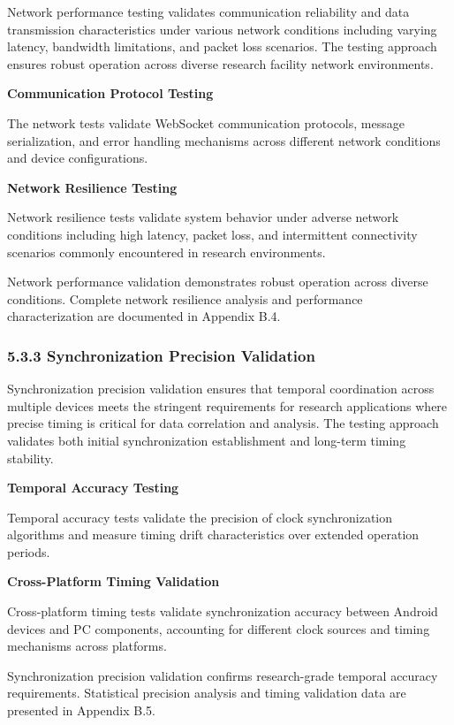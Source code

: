 \documentclass[12pt,a4paper]{article}
\begin{document}
Network performance testing validates communication reliability and data transmission characteristics under various
network conditions including varying latency, bandwidth limitations, and packet loss scenarios. The testing approach
ensures robust operation across diverse research facility network environments.

\textbf{Communication Protocol Testing}

The network tests validate WebSocket communication protocols, message serialization, and error handling mechanisms
across different network conditions and device configurations.

\textbf{Network Resilience Testing}

Network resilience tests validate system behavior under adverse network conditions including high latency, packet loss,
and intermittent connectivity scenarios commonly encountered in research environments.

Network performance validation demonstrates robust operation across diverse conditions. Complete network resilience
analysis and performance characterization are documented in Appendix B.4.

\subsubsection{5.3.3 Synchronization Precision Validation}

Synchronization precision validation ensures that temporal coordination across multiple devices meets the stringent
requirements for research applications where precise timing is critical for data correlation and analysis. The testing
approach validates both initial synchronization establishment and long-term timing stability.

\textbf{Temporal Accuracy Testing}

Temporal accuracy tests validate the precision of clock synchronization algorithms and measure timing drift
characteristics over extended operation periods.

\textbf{Cross-Platform Timing Validation}

Cross-platform timing tests validate synchronization accuracy between Android devices and PC components, accounting for
different clock sources and timing mechanisms across platforms.

Synchronization precision validation confirms research-grade temporal accuracy requirements. Statistical precision
analysis and timing validation data are presented in Appendix B.5.
\end{document}
